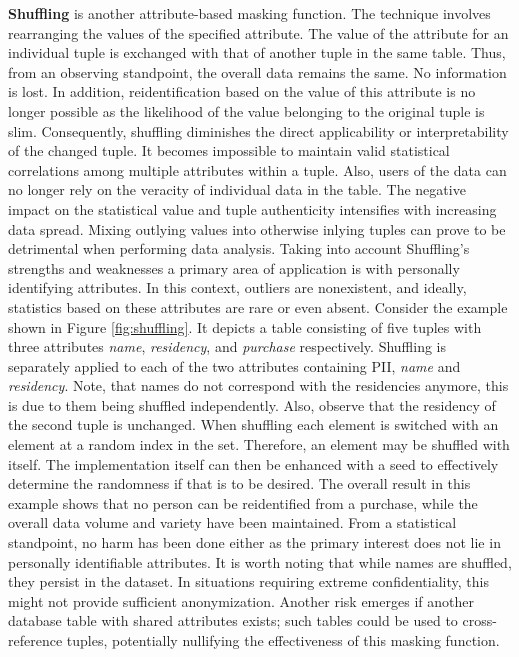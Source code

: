 \textbf{Shuffling} is another attribute-based masking function. The technique involves rearranging the values of the specified attribute. The value of the attribute for an individual tuple is exchanged with that of another tuple in the same table. Thus, from an observing standpoint, the overall data remains the same. No information is lost. In addition, reidentification based on the value of this attribute is no longer possible as the likelihood of the value belonging to the original tuple is slim. Consequently, shuffling diminishes the direct applicability or interpretability of the changed tuple. It becomes impossible to maintain valid statistical correlations among multiple attributes within a tuple. Also, users of the data can no longer rely on the veracity of individual data in the table. The negative impact on the statistical value and tuple authenticity intensifies with increasing data spread. Mixing outlying values into otherwise inlying tuples can prove to be detrimental when performing data analysis. Taking into account Shuffling's strengths and weaknesses a primary area of application is with personally identifying attributes. In this context, outliers are nonexistent, and ideally, statistics based on these attributes are rare or even absent. Consider the example shown in Figure \ref{fig:shuffling}. It depicts a table consisting of five tuples with three attributes \textit{name}, \textit{residency}, and \textit{purchase} respectively. Shuffling is separately applied to each of the two attributes containing \ac{PII}, \textit{name} and \textit{residency}. Note, that names do not correspond with the residencies anymore, this is due to them being shuffled independently. Also, observe that the residency of the second tuple is unchanged. When shuffling each element is switched with an element at a random index in the set. Therefore, an element may be shuffled with itself. The implementation itself can then be enhanced with a seed to effectively determine the randomness if that is to be desired. The overall result in this example shows that no person can be reidentified from a purchase, while the overall data volume and variety have been maintained. From a statistical standpoint, no harm has been done either as the primary interest does not lie in personally identifiable attributes. It is worth noting that while names are shuffled, they persist in the dataset. In situations requiring extreme confidentiality, this might not provide sufficient anonymization. Another risk emerges if another database table with shared attributes exists; such tables could be used to cross-reference tuples, potentially nullifying the effectiveness of this masking function.


